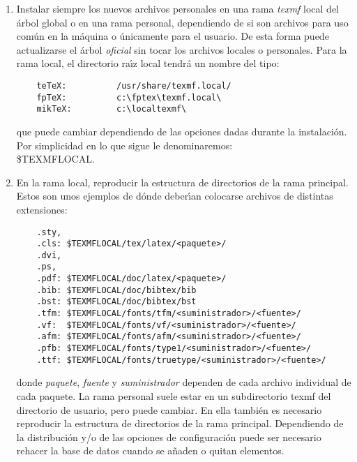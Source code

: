 	\begin{enumerate}
	\item Instalar siempre los nuevos archivos personales en una rama
	{\itshape texmf\/} local del \'arbol global o en una rama personal,
	dependiendo de si son archivos para uso com\'un en la m\'aquina o
	\'unicamente para el usuario. De esta forma puede actualizarse el
	\'arbol {\itshape oficial\/} sin tocar los archivos locales o
	personales. Para la rama local, el directorio ra\'\i{}z local tendr\'a
	un nombre del tipo:
	\begin{verbatim}
	teTeX:          /usr/share/texmf.local/
	fpTeX:          c:\fptex\texmf.local\
	mikTeX:         c:\localtexmf\
	\end{verbatim}
 	que puede cambiar dependiendo de las opciones dadas durante la
	instalaci\'on. Por simplicidad en lo que sigue le denominaremos:\\
	{\ttfamily \$TEXMFLOCAL}.
	\item En la rama local, reproducir la estructura de directorios de la
	rama principal. Estos son unos ejemplos de d\'onde deber\'\i{}an
	colocarse archivos de distintas extensiones:
	\begin{verbatim}
	.sty,
	.cls: $TEXMFLOCAL/tex/latex/<paquete>/
	.dvi, 
	.ps,
	.pdf: $TEXMFLOCAL/doc/latex/<paquete>/
	.bib: $TEXMFLOCAL/doc/bibtex/bib
	.bst: $TEXMFLOCAL/doc/bibtex/bst
	.tfm: $TEXMFLOCAL/fonts/tfm/<suministrador>/<fuente>/
	.vf:  $TEXMFLOCAL/fonts/vf/<suministrador>/<fuente>/
	.afm: $TEXMFLOCAL/fonts/afm/<suministrador>/<fuente>/
	.pfb: $TEXMFLOCAL/fonts/type1/<suministrador>/<fuente>/
	.ttf: $TEXMFLOCAL/fonts/truetype/<suministrador>/<fuente>/
	\end{verbatim}
 	donde {\itshape paquete\/}, {\itshape fuente\/} y {\itshape suministrador\/} dependen de
	cada archivo individual de cada paquete.
	La rama personal suele estar en un subdirectorio {\ttfamily texmf} del
	directorio de usuario, pero puede cambiar. En ella tambi\'en es
	necesario reproducir la estructura de directorios de la rama
	principal. Dependiendo de la distribuci\'on y/o de las opciones de
	configuraci\'on puede ser necesario rehacer la base de datos
	cuando se a\~naden o quitan elementos.

	\end{enumerate}

